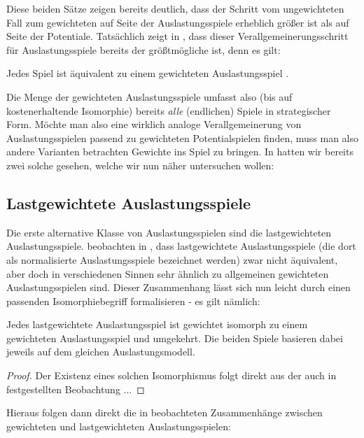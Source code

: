 Diese beiden Sätze zeigen bereits deutlich, dass der Schritt vom ungewichteten Fall zum gewichteten auf Seite der Auslastungsspiele erheblich größer ist als auf Seite der Potentiale. Tatsächlich zeigt \citeauthor{ReprOfFiniteGamesAsNCG} in \cite{ReprOfFiniteGamesAsNCG}, dass dieser Verallgemeinerungsschritt für Auslastungsspiele bereits der größtmögliche ist, denn es gilt:

\begin{satz}
	Jedes Spiel ist äquivalent zu einem gewichteten Auslastungsspiel .
\end{satz}

Die Menge der gewichteten Auslastungsspiele umfasst also (bis auf kostenerhaltende Isomorphie) bereits \emph{alle} (endlichen) Spiele in strategischer Form. Möchte man also eine wirklich analoge Verallgemeinerung von Auslastungsspielen passend zu gewichteten Potentialspielen finden, muss man also andere Varianten betrachten Gewichte ins Spiel zu bringen. In  hatten wir bereits zwei solche gesehen, welche wir nun näher untersuchen wollen:

\subsection{Lastgewichtete Auslastungsspiele}

Die erste alternative Klasse von Auslastungsspielen sind die lastgewichteten Auslastungsspiele. \citeauthor{CharExGewPotinWCG} beobachten in \cite{CharExGewPotinWCG}, dass lastgewichtete Auslastungsspiele (die dort als normalisierte Auslastungsspiele bezeichnet werden) zwar nicht äquivalent, aber doch in verschiedenen Sinnen sehr ähnlich zu allgemeinen gewichteten Auslastungsspielen sind. Dieser Zusammenhang lässt sich nun leicht durch einen passenden Isomorphiebegriff formalisieren - es gilt nämlich:

\begin{lemma}
	Jedes lastgewichtete Auslastungsspiel ist gewichtet isomorph zu einem gewichteten Auslastungsspiel und umgekehrt. Die beiden Spiele basieren dabei jeweils auf dem gleichen Auslastungsmodell.
\end{lemma}

\begin{proof}
	Der Existenz eines solchen Isomorphismus folgt direkt aus der auch in \cite{CharExGewPotinWCG} festgestellten Beobachtung ...
\end{proof}

Hieraus folgen dann direkt die in \cite{CharExGewPotinWCG} beobachteten Zusammenhänge zwischen gewichteten und lastgewichteten Auslastungsspielen:

